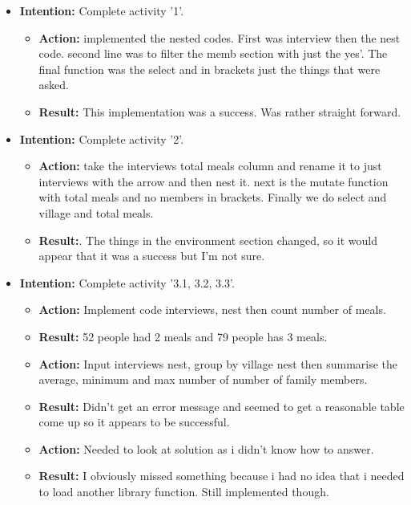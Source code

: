 \documentclass{article}
\begin{document}
\begin{itemize}

\item{\textbf{Intention:} Complete activity '1'.}

\begin{itemize}
\item{\textbf{Action:} implemented the nested codes. First was interview then the nest code. second line was to filter the memb section with just the yes'. The final function was the select and in brackets just the things that were asked.}
\item{\textbf{Result:} This implementation was a success. Was rather straight forward.}
\end{itemize}

\item{\textbf{Intention:} Complete activity '2'.}

\begin{itemize}
\item{\textbf{Action:} take the interviews total meals column and rename it to just interviews with the arrow and then nest it. next is the mutate function with total meals and no members in brackets. Finally we do select and village and total meals.}
\item{\textbf{Result:}. The things in the environment section changed, so it would appear that it was a success but I'm not sure.}
\end{itemize}

\item{\textbf{Intention:} Complete activity '3.1, 3.2, 3.3'.}

\begin{itemize}
\item{\textbf{Action:} Implement code interviews, nest then count number of meals.}
\item{\textbf{Result:} 52 people had 2 meals and 79 people has 3 meals.}

\item{\textbf{Action:} Input interviews nest, group by village nest then summarise the average, minimum and max number of number of family members.}
\item{\textbf{Result:} Didn't get an error message and seemed to get a reasonable table come up so it appears to be successful.}

\item{\textbf{Action:} Needed to look at solution as i didn't know how to answer.}
\item{\textbf{Result:} I obviously missed something because i had no idea that i needed to load another library function. Still implemented though.}



\end{itemize}
\end{itemize}
\end{document}
